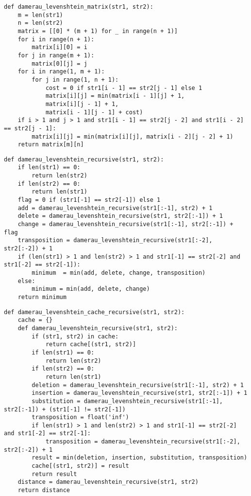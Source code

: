 \begin{center}
    \captionsetup{justification=raggedright,singlelinecheck=off}
    \begin{lstlisting}[label=lst:lev_mat,caption=Алгоритм нахождения расстояния Дамерау-Левенштейна]
def damerau_levenshtein_matrix(str1, str2):
	m = len(str1)
	n = len(str2)
	matrix = [[0] * (m + 1) for _ in range(n + 1)]
	for i in range(n + 1):
		matrix[i][0] = i
	for j in range(m + 1):
		matrix[0][j] = j
	for i in range(1, m + 1):
		for j in range(1, n + 1):
			cost = 0 if str1[i - 1] == str2[j - 1] else 1
			matrix[i][j] = min(matrix[i - 1][j] + 1,         
			matrix[i][j - 1] + 1,        
			matrix[i - 1][j - 1] + cost) 
	if i > 1 and j > 1 and str1[i - 1] == str2[j - 2] and str1[i - 2] == str2[j - 1]:
		matrix[i][j] = min(matrix[i][j], matrix[i - 2][j - 2] + 1)
	return matrix[m][n]
\end{lstlisting}
\clearpage
    \captionsetup{justification=raggedright,singlelinecheck=off}
    \begin{lstlisting}[label=lst:lev_cach,caption=Рекурсивный алгоритм нахождения расстояния Дамерау-Левенштейна]
def damerau_levenshtein_recursive(str1, str2):
	if len(str1) == 0:
		return len(str2)
	if len(str2) == 0:
		return len(str1)
	flag = 0 if (str1[-1] == str2[-1]) else 1
	add = damerau_levenshtein_recursive(str1[:-1], str2) + 1
	delete = damerau_levenshtein_recursive(str1, str2[:-1]) + 1
	change = damerau_levenshtein_recursive(str1[:-1], str2[:-1]) + flag
	transposition = damerau_levenshtein_recursive(str1[:-2], str2[:-2]) + 1
	if (len(str1) > 1 and len(str2) > 1 and str1[-1] == str2[-2] and str1[-2] == str2[-1]):
		minimum  = min(add, delete, change, transposition)
	else:
		minimum = min(add, delete, change)
	return minimum
\end{lstlisting}
\end{center}
\clearpage

\begin{center}
    \captionsetup{justification=raggedright,singlelinecheck=off}
    \begin{lstlisting}[label=lst:dam_lev_rec,caption=Рекурсивный алгоритм нахождения расстояния Дамерау-Левенштейна с использованием кеша]
def damerau_levenshtein_cache_recursive(str1, str2):
	cache = {}
	def damerau_levenshtein_recursive(str1, str2):
		if (str1, str2) in cache:
			return cache[(str1, str2)]
		if len(str1) == 0:
			return len(str2)
		if len(str2) == 0:
			return len(str1)
		deletion = damerau_levenshtein_recursive(str1[:-1], str2) + 1
		insertion = damerau_levenshtein_recursive(str1, str2[:-1]) + 1
		substitution = damerau_levenshtein_recursive(str1[:-1], str2[:-1]) + (str1[-1] != str2[-1])
		transposition = float('inf')
		if len(str1) > 1 and len(str2) > 1 and str1[-1] == str2[-2] and str1[-2] == str2[-1]:
			transposition = damerau_levenshtein_recursive(str1[:-2], str2[:-2]) + 1
		result = min(deletion, insertion, substitution, transposition)
		cache[(str1, str2)] = result
		return result
	distance = damerau_levenshtein_recursive(str1, str2)
	return distance
\end{lstlisting}
\end{center}


